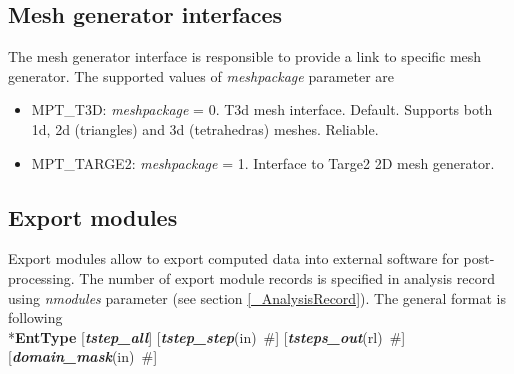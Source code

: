 \documentclass[draft]{article}
\newcommand{\param}[1]{{\em #1}}
\newcommand{\keywordnotype}[1]{\mbox{{\it{\bf{#1}}}}}
\newcommand{\keyword}[2]{\mbox{{\keywordnotype{#1}\tiny (#2)}}}
\newcommand{\entKeyword}[1]{\mbox{{*{\bf{#1}}}}}
\newcommand{\field}[2]{\mbox{\keyword{#1}{#2}~\#}}
\newcommand{\optField}[2]{\mbox{[\field{#1}{#2}]}}
\begin{document}
\subsection{Mesh generator interfaces}
\label{meshpackages}
The mesh generator interface is responsible to provide a link to
specific mesh generator. The supported values of \param{meshpackage}
parameter are 
\begin{itemize}
\item
MPT\_T3D:  \param{meshpackage} = 0. T3d mesh interface. Default. Supports both 1d, 2d
(triangles) and 3d (tetrahedras) meshes. Reliable.
\item
MPT\_TARGE2:	\param{meshpackage} = 1. Interface to Targe2 2D
mesh generator.
\end{itemize}
%

\subsection{Export modules}
\label{ExportModulesSec}
Export modules allow to export computed data into external software for
post-processing. The number of export module records is specified in
analysis record using \param{nmodules} parameter (see section \ref{_AnalysisRecord}). The general format
is following\\
\entKeyword{EntType} [\keywordnotype{tstep\_all}]
\optField{tstep\_step}{in} \optField{tsteps\_out}{rl}\newline
[\keywordnotype{domain\_all}] \optField{domain\_mask}{in}\\
\end{document}
